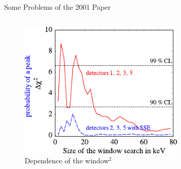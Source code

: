 \begin{frame}{Some Problems of the 2001 Paper}
\begin{columns}
\begin{column}{.5\textwidth}
{\begin{figure}
					\includegraphics[width=0.7\textwidth]{media/window_dependence.pdf}
					\caption*{Dependence of the window${}^2$}
				\end{figure}}
		\end{column}
	\end{columns}
	\vspace{-1em}
\end{frame}
